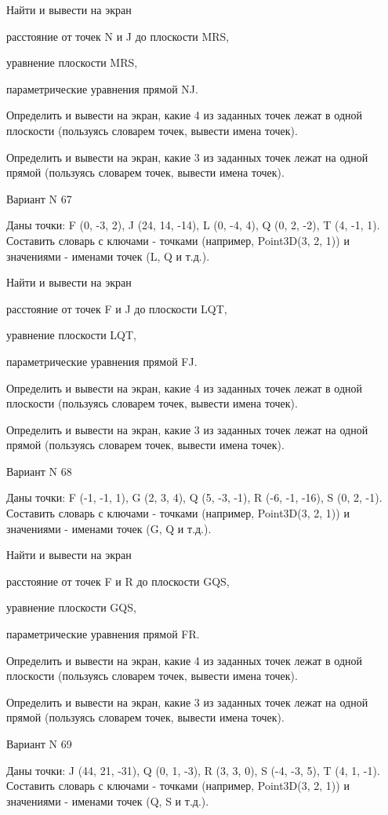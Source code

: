 \documentclass[11pt]{report}
\begin{document}
 
Найти и вывести на экран


расстояние от точек N и J до плоскости MRS,

 
уравнение плоскости MRS,

 
параметрические уравнения прямой NJ.


Определить и вывести на экран, какие 4 из заданных точек лежат в одной плоскости (пользуясь словарем точек, вывести имена точек).


Определить и вывести на экран, какие 3 из заданных точек лежат на одной прямой (пользуясь словарем точек, вывести имена точек).

Вариант N 67

Даны точки: F (0, -3, 2), J (24, 14, -14), L (0, -4, 4), Q (0, 2, -2), T (4, -1, 1).
Составить словарь с ключами - точками (например, Point3D(3, 2, 1)) и значениями - именами точек (L, Q и т.д.).

 
Найти и вывести на экран


расстояние от точек F и J до плоскости LQT,

 
уравнение плоскости LQT,

 
параметрические уравнения прямой FJ.


Определить и вывести на экран, какие 4 из заданных точек лежат в одной плоскости (пользуясь словарем точек, вывести имена точек).


Определить и вывести на экран, какие 3 из заданных точек лежат на одной прямой (пользуясь словарем точек, вывести имена точек).

Вариант N 68

Даны точки: F (-1, -1, 1), G (2, 3, 4), Q (5, -3, -1), R (-6, -1, -16), S (0, 2, -1).
Составить словарь с ключами - точками (например, Point3D(3, 2, 1)) и значениями - именами точек (G, Q и т.д.).

 
Найти и вывести на экран


расстояние от точек F и R до плоскости GQS,

 
уравнение плоскости GQS,

 
параметрические уравнения прямой FR.


Определить и вывести на экран, какие 4 из заданных точек лежат в одной плоскости (пользуясь словарем точек, вывести имена точек).


Определить и вывести на экран, какие 3 из заданных точек лежат на одной прямой (пользуясь словарем точек, вывести имена точек).

Вариант N 69

Даны точки: J (44, 21, -31), Q (0, 1, -3), R (3, 3, 0), S (-4, -3, 5), T (4, 1, -1).
Составить словарь с ключами - точками (например, Point3D(3, 2, 1)) и значениями - именами точек (Q, S и т.д.).
\end{document}
